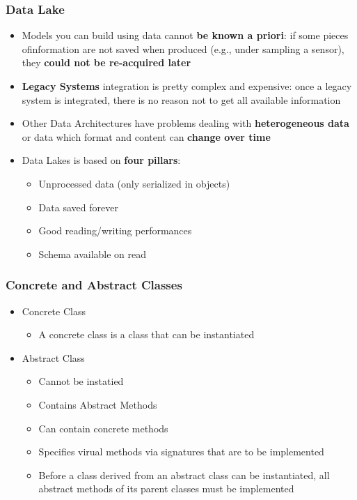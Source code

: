 \subsubsection{Data Lake}
\begin{itemize}
	\item Models you can build using data cannot \textbf{be known a priori}: if some pieces ofinformation are not saved when produced (e.g., under sampling a sensor), they \textbf{could not be re-acquired later}
	\item \textbf{Legacy Systems} integration is pretty complex and expensive: once a legacy system is integrated, there is no reason not to get all available information
	\item Other Data Architectures have problems dealing with \textbf{heterogeneous data} or data which format and content can \textbf{change over time}
	\item Data Lakes is based on \textbf{four pillars}:
	\begin{itemize}
		\item Unprocessed data (only serialized in objects)
		\item Data saved forever
		\item Good reading/writing performances
		\item Schema available on read
	\end{itemize}
\end{itemize}

\subsubsection{Concrete and Abstract Classes}
\begin{itemize}
	\item Concrete Class
	\begin{itemize}
		\item A concrete class is a class that can be instantiated
	\end{itemize}
	\item Abstract Class
	\begin{itemize}
		\item Cannot be instatied
		\item Contains Abstract Methods
		\item Can contain concrete methods
		\item Specifies virual methods via signatures that are to be implemented
		\item Before a class derived from an abstract class can be instantiated, all abstract methods of its parent classes must be implemented
	\end{itemize}
\end{itemize}

